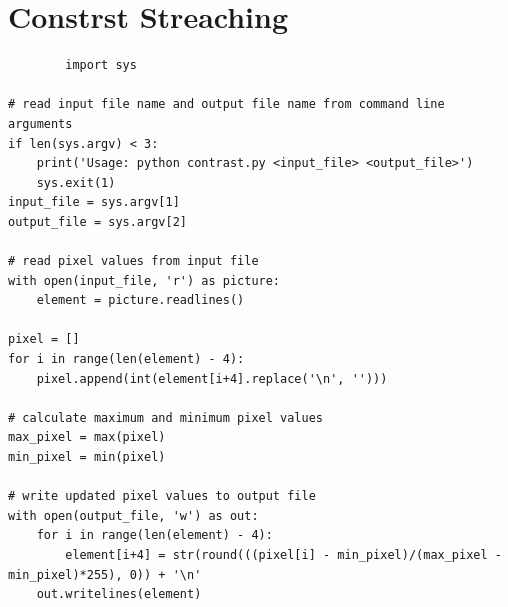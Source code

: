 \documentclass[a4paper,8pt]{article}
\begin{document}
        \section{Constrst Streaching}
        \begin{verbatim}
        import sys

# read input file name and output file name from command line arguments
if len(sys.argv) < 3:
    print('Usage: python contrast.py <input_file> <output_file>')
    sys.exit(1)
input_file = sys.argv[1]
output_file = sys.argv[2]

# read pixel values from input file
with open(input_file, 'r') as picture:
    element = picture.readlines()

pixel = []
for i in range(len(element) - 4):
    pixel.append(int(element[i+4].replace('\n', '')))

# calculate maximum and minimum pixel values
max_pixel = max(pixel)
min_pixel = min(pixel)

# write updated pixel values to output file
with open(output_file, 'w') as out:
    for i in range(len(element) - 4):
        element[i+4] = str(round(((pixel[i] - min_pixel)/(max_pixel - min_pixel)*255), 0)) + '\n'
    out.writelines(element)


        \end{verbatim}
        
\end{document}
